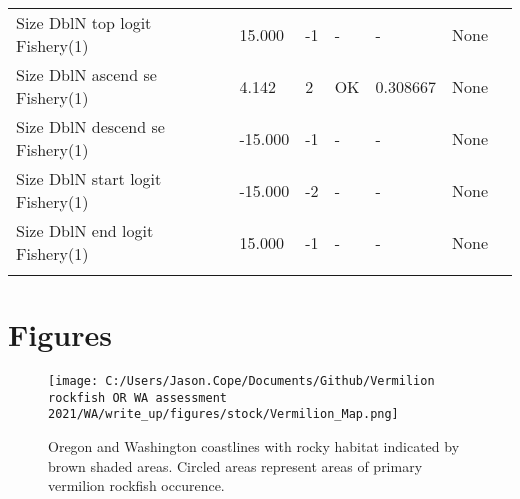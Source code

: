 \documentclass[11pt,
  english,
  a4paper,
]{article}
\begin{document}
\begin{landscape}
\begin{longtable}[t]{>{\raggedright\arraybackslash}p{6cm}lllll>{\raggedright\arraybackslash}p{4cm}}
Size DblN top logit Fishery(1) & 15.000 & -1 & - & - & None\\
Size DblN ascend se Fishery(1) & 4.142 & 2 & OK & 0.308667 & None\\
Size DblN descend se Fishery(1) & -15.000 & -1 & - & - & None\\
Size DblN start logit Fishery(1) & -15.000 & -2 & - & - & None\\
Size DblN end logit Fishery(1) & 15.000 & -1 & - & - & None\\*
\end{longtable}
\leavevmode\tagmcend\tagstructend\par
\endgroup{}
\end{landscape}
\endgroup{}





\newpage







\newpage



\newpage

\clearpage


\hypertarget{figures}{%
\section{Figures}\label{figures}}

\leavevmode\tagmcend\tagstructend


\begin{figure}
\centering
\texttt{[image: C:/Users/Jason.Cope/Documents/Github/Vermilion rockfish OR WA assessment 2021/WA/write\_up/figures/stock/Vermilion\_Map.png]}
\caption{Oregon and Washington coastlines with rocky habitat indicated by brown shaded areas. Circled areas represent areas of primary vermilion rockfish occurence.\label{fig:ORWA-map}}
\end{figure}
\end{document}
